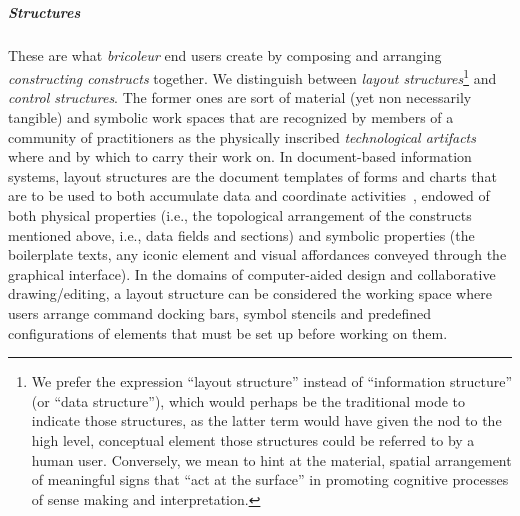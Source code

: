 \documentclass{article}
\begin{document}
\subparagraph{Structures} These are what \textit{bricoleur} end users create by composing and arranging \emph{constructing constructs} together. We distinguish between \emph{layout structures}\footnote{We prefer the expression ``layout structure'' instead of ``information structure'' (or ``data structure''), which would perhaps be the traditional mode to indicate those structures, as the latter term would have given the nod to the high level, conceptual element those structures could be referred to by a human user. Conversely, we mean to hint at the material, spatial arrangement of meaningful signs that ``act at the surface'' in promoting cognitive processes of sense making and interpretation.} and \emph{control structures}. The former ones are sort of material (yet non necessarily tangible) and symbolic work spaces that are recognized by members of a community of practitioners as the physically inscribed \emph{technological artifacts}~\citep{orlikowski_using_2000} where and by which to carry their work on. In document-based information systems, layout structures are the document templates of forms and charts that are to be used to both accumulate data and coordinate activities~\citep{berg_accumulating_1999}, endowed of both physical properties (i.e., the topological arrangement of the constructs mentioned above, i.e., data fields and sections) and symbolic properties (the boilerplate texts, any iconic element and visual affordances conveyed through the graphical interface). In the domains of computer-aided design and collaborative drawing/editing, a layout structure can be considered the working space where users arrange command docking bars, symbol stencils and predefined configurations of elements that must be set up before working on them. 
\end{document}
